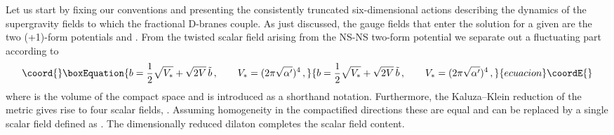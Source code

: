 \documentclass[a4paper,11pt]{article}
\providecommand{\ZZ}{\mathbb{Z}}  \providecommand{\Zint}{\mathbb{Z}}
\begin{document}
Let us start by fixing our conventions and presenting the consistently
truncated six-dimensional actions describing the dynamics of the
supergravity fields to which the fractional D\coordHE{}-branes couple. As
just discussed, the gauge fields that enter the solution for a given
\coordHE{} are the two (\coordHE{}+1)-form potentials \coordHE{} and \coordHE{}.
{}From the twisted scalar field arising from the NS-NS two-form
potential we separate out a fluctuating part \coordHE{} according to
\begin{equation}\coord{}\boxEquation{
\label{Vsdef}
b = \frac{1}{2}\sqrt{V_*} + \sqrt{2V}\,\tilde b \spa
V_*=(2\pi\sqrt{\alpha'})^4 \,,
}{
b = \frac{1}{2}\sqrt{V_*} + \sqrt{2V}\,\tilde b \spa
V_*=(2\pi\sqrt{\alpha'})^4 \,,
}{ecuacion}\coordE{}\end{equation}
where \coordHE{} is the volume of the compact space \myHighlight{$T^4\!/\ZZ_2$}\coordHE{} and \coordHE{}
is introduced as a shorthand notation. Furthermore, the Kaluza--Klein
reduction of the metric gives rise to four scalar fields,
\coordHE{}. Assuming homogeneity in the compactified
directions these are equal and can be replaced by a single scalar field
defined as \coordHE{}. The dimensionally reduced
dilaton \coordHE{} completes the scalar field
content.
\end{document}
